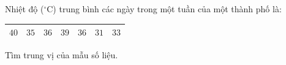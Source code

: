\begin{ex}
Nhiệt độ ($^\circ$C) trung bình các ngày trong một tuần của một thành phố là:
\begin{center}
\begin{tabular}{|c|c|c|c|c|c|c|}\hline
$40$ & $35$ & $36$ & $39$ & $36$ & $31$ & $33$\\\hline
\end{tabular}
\end{center}
Tìm trung vị của mẫu số liệu.
\end{ex}
